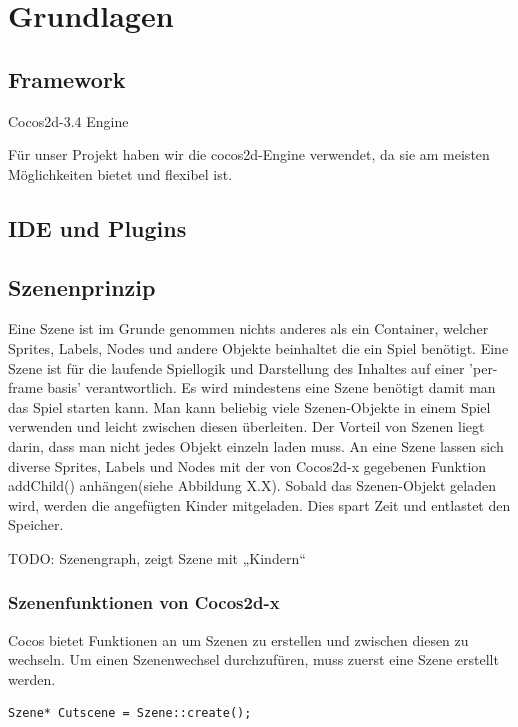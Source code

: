 \chapter{Grundlagen}

\section{Framework}

Cocos2d-3.4 Engine

Für unser Projekt haben wir die cocos2d-Engine verwendet, da sie am meisten Möglichkeiten bietet und flexibel ist.

\section{IDE und Plugins}

\section{Szenenprinzip} 
Eine Szene ist im Grunde genommen nichts anderes als ein Container, welcher  Sprites, Labels, Nodes und andere Objekte beinhaltet die ein Spiel benötigt. Eine Szene ist für die laufende Spiellogik und Darstellung des Inhaltes auf einer 'per-frame basis' verantwortlich. Es wird mindestens eine Szene benötigt damit man das Spiel starten kann. Man kann beliebig viele Szenen-Objekte in einem Spiel verwenden und leicht zwischen diesen überleiten. Der Vorteil von Szenen liegt darin, dass man nicht jedes Objekt einzeln laden muss. An eine Szene lassen sich diverse Sprites, Labels und Nodes mit der von Cocos2d-x gegebenen Funktion addChild() anhängen(siehe Abbildung X.X). Sobald das Szenen-Objekt geladen wird, werden die angefügten Kinder mitgeladen. Dies spart Zeit und entlastet den Speicher.

TODO: Szenengraph, zeigt Szene mit „Kindern“

\subsection{Szenenfunktionen von Cocos2d-x}

Cocos bietet Funktionen an um Szenen zu erstellen und zwischen diesen zu wechseln. Um einen Szenenwechsel durchzufüren, muss zuerst eine Szene erstellt werden.

\begin{lstlisting}[style=singleline]
	Szene* Cutscene = Szene::create();
\end{lstlisting}


